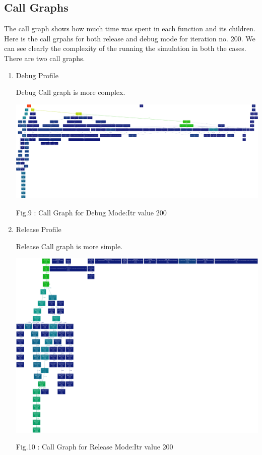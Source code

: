 \documentclass[a4paper,11pt]{article}
\begin{document}
\subsection{Call Graphs}
The call graph shows how much time was spent in each function and its children. Here is the call grpahs for both release and debug mode for iteration no. 200. We can see clearly the complexity of the running the simulation in both the cases. There are two call graphs.
\begin{enumerate}
\item{Debug Profile}
\begin{description} Debug Call graph is more complex.
\begin{center}
\includegraphics[scale=0.1]{./doc/deb_output200.png}
\begin{center}
Fig.9 : Call Graph for Debug Mode:Itr value 200
\end{center}
\end{center}
\end{description}

\item{Release Profile}
\begin{description} Release Call graph is more simple.
\begin{center}
\includegraphics[scale=0.1]{./doc/rel_output200.png}
\begin{center}
Fig.10 : Call Graph for Release Mode:Itr value 200
\end{center}
\end{center}
\end{description}

\end{enumerate}
\end{document}
